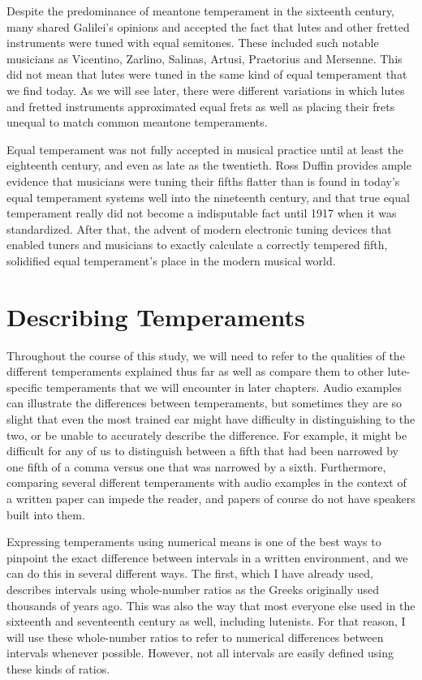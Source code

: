 Despite the predominance of meantone temperament in the sixteenth century, many shared
Galilei's opinions and accepted the fact that lutes and other fretted instruments were
tuned with equal semitones.  These included such notable musicians as Vicentino,
Zarlino, Salinas, Artusi, Praetorius and Mersenne. \autocite[19]{ML:1} This did not
mean that lutes were tuned in the same kind of equal temperament that we find today. As
we will see later, there were different variations in which lutes and fretted
instruments approximated equal frets as well as placing their frets unequal to match
common meantone temperaments.

Equal temperament was not fully accepted in musical practice until at least the
eighteenth century, and even as late as the twentieth.  Ross Duffin provides ample
evidence that musicians were tuning their fifths flatter than is found in today's equal
temperament systems well into the nineteenth century, and that true equal temperament
really did not become a indisputable fact until 1917 when it was standardized.
\autocite[138]{RD:1}  After that, the advent of modern electronic tuning devices that
enabled tuners and musicians to exactly calculate a correctly tempered fifth,
solidified equal temperament's place in the modern musical world.

\section{Describing Temperaments}

Throughout the course of this study, we will need to refer to the qualities of the
different temperaments explained thus far as well as compare them to other lute-specific
temperaments that we will encounter in later chapters.  Audio examples can illustrate the
differences between temperaments, but sometimes they are so slight that even the most
trained ear might have difficulty in distinguishing to the two, or be unable to accurately
describe the difference. For example, it might be difficult for any of us to distinguish
between a fifth that had been narrowed by one fifth of a comma versus one that was
narrowed by a sixth.  Furthermore, comparing several different temperaments with audio
examples in the context of a written paper can impede the reader, and papers of course do
not have speakers built into them.

Expressing temperaments using numerical means is one of the best ways to pinpoint the
exact difference between intervals in a written environment, and we can do this in
several different ways.  The first, which I have already used, describes intervals
using whole-number ratios as the Greeks originally used thousands of years ago.  This
was also the way that most everyone else used in the sixteenth and seventeenth century
as well, including lutenists.  For that reason, I will use these whole-number ratios to
refer to numerical differences between intervals whenever possible. However, not all
intervals are easily defined using these kinds of ratios.

